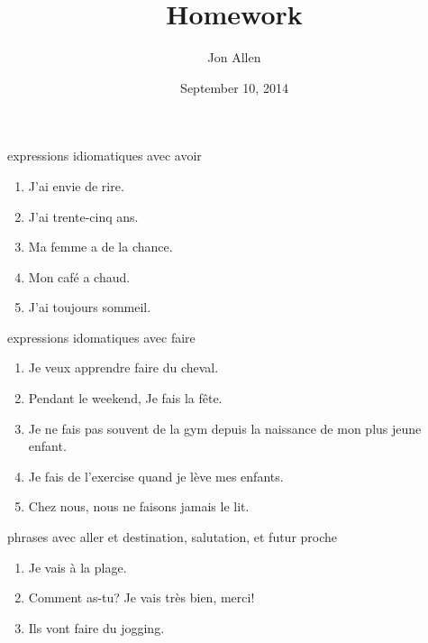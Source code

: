\documentclass[letterpaper]{article}
\begin{document}
\title{Homework}
\date{September 10, 2014}
\author{Jon Allen}
\maketitle
expressions idiomatiques avec avoir
\begin{enumerate}
\item
J'ai envie de rire.
\item
J'ai trente-cinq ans.
\item
Ma femme a de la chance.
\item
Mon café a chaud.
\item
J'ai toujours sommeil.
\end{enumerate}
expressions idomatiques avec faire
\begin{enumerate}
\item
Je veux apprendre faire du cheval.
\item
Pendant le weekend, Je fais la fête.
\item
Je ne fais pas souvent de la gym depuis la naissance de mon plus jeune enfant.
\item
Je fais de l'exercise quand je lève mes enfants.
\item
Chez nous, nous ne faisons jamais le lit.
\end{enumerate}
phrases avec aller et destination, salutation, et futur proche
\begin{enumerate}
\item
Je vais à la plage.
\item
Comment as-tu? Je vais très bien, merci!
\item
Ils vont faire du jogging.
\end{enumerate}
\end{document}
